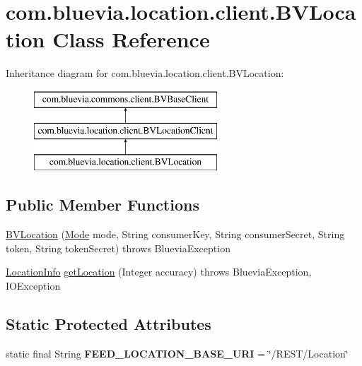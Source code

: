 \hypertarget{classcom_1_1bluevia_1_1location_1_1client_1_1BVLocation}{
\section{com.bluevia.location.client.BVLocation Class Reference}
\label{classcom_1_1bluevia_1_1location_1_1client_1_1BVLocation}
}
Inheritance diagram for com.bluevia.location.client.BVLocation:\begin{figure}[H]
\begin{center}
\leavevmode
\includegraphics[height=3.000000cm]{classcom_1_1bluevia_1_1location_1_1client_1_1BVLocation}
\end{center}
\end{figure}
\subsection*{Public Member Functions}
\begin{DoxyCompactItemize}
\item 
\hyperlink{classcom_1_1bluevia_1_1location_1_1client_1_1BVLocation_ace28a9b6673be8e4eeee9541d9b1c8fe}{BVLocation} (\hyperlink{classcom_1_1bluevia_1_1commons_1_1client_1_1BVBaseClient_a5f4a4a27d73a8ddd0ce450a6c7a4d1b7}{Mode} mode, String consumerKey, String consumerSecret, String token, String tokenSecret)  throws BlueviaException
\item 
\hyperlink{classcom_1_1bluevia_1_1location_1_1data_1_1LocationInfo}{LocationInfo} \hyperlink{classcom_1_1bluevia_1_1location_1_1client_1_1BVLocation_ab139fabcad3b9a50a07c54e90ddbe23e}{getLocation} (Integer accuracy)  throws BlueviaException, IOException 
\end{DoxyCompactItemize}
\subsection*{Static Protected Attributes}
\begin{DoxyCompactItemize}
\item 
\hypertarget{classcom_1_1bluevia_1_1location_1_1client_1_1BVLocation_a0f846e6fe9e607b75febd9ca0309d7b3}{
static final String {\bfseries FEED\_\-LOCATION\_\-BASE\_\-URI} = \char`\"{}/REST/Location\char`\"{}}
\label{classcom_1_1bluevia_1_1location_1_1client_1_1BVLocation_a0f846e6fe9e607b75febd9ca0309d7b3}

\end{DoxyCompactItemize}


